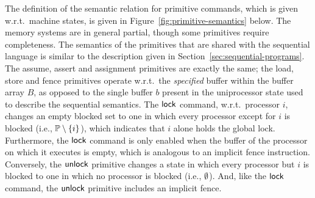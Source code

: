 \documentclass[11pt]{report}
\begin{document}
The definition of the semantic relation for primitive commands, which is given w.r.t.\ machine states, is given in Figure~\ref{fig:primitive-semantics} below. The memory systems are in general partial, though some primitives require completeness. The semantics of the primitives that are shared with the sequential language is  similar to the description given in Section~\ref{sec:sequential-programs}. The assume, assert and assignment primitives are exactly the same; the load, store and fence primitives operate w.r.t.\ the \emph{specified} buffer within the buffer array $B$, as opposed to the single buffer $b$ present in the uniprocessor state used to describe the sequential semantics. The $\operatorname{\mathsf{lock}}$ command, w.r.t.\ processor $i$, changes an empty blocked set to one in which every processor except for $i$ is blocked (i.e., $\mathbb{P} \setminus \left\lbrace i \right\rbrace$), which indicates that $i$ alone holds the global lock. Furthermore, the $\operatorname{\mathsf{lock}}$ command is only enabled when the buffer of the processor on which it executes is empty, which is analogous to an implicit fence instruction. Conversely, the $\operatorname{\mathsf{unlock}}$ primitive changes a state in which every processor but $i$ is blocked to one in which no processor is blocked (i.e., $\operatorname{\emptyset}$). And, like the $\operatorname{\mathsf{lock}}$ command, the $\operatorname{\mathsf{unlock}}$ primitive includes an implicit fence. 
\end{document}
